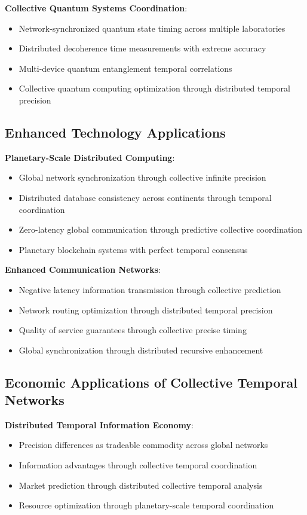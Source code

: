\documentclass[12pt,a4paper]{article}
\begin{document}
\textbf{Collective Quantum Systems Coordination}:
\begin{itemize}
\item Network-synchronized quantum state timing across multiple laboratories
\item Distributed decoherence time measurements with extreme accuracy
\item Multi-device quantum entanglement temporal correlations
\item Collective quantum computing optimization through distributed temporal precision
\end{itemize}

\subsection{Enhanced Technology Applications}

\textbf{Planetary-Scale Distributed Computing}:
\begin{itemize}
\item Global network synchronization through collective infinite precision
\item Distributed database consistency across continents through temporal coordination
\item Zero-latency global communication through predictive collective coordination
\item Planetary blockchain systems with perfect temporal consensus
\end{itemize}

\textbf{Enhanced Communication Networks}:
\begin{itemize}
\item Negative latency information transmission through collective prediction
\item Network routing optimization through distributed temporal precision
\item Quality of service guarantees through collective precise timing
\item Global synchronization through distributed recursive enhancement
\end{itemize}

\subsection{Economic Applications of Collective Temporal Networks}

\textbf{Distributed Temporal Information Economy}:
\begin{itemize}
\item Precision differences as tradeable commodity across global networks
\item Information advantages through collective temporal coordination
\item Market prediction through distributed collective temporal analysis
\item Resource optimization through planetary-scale temporal coordination
\end{itemize}
\end{document}
